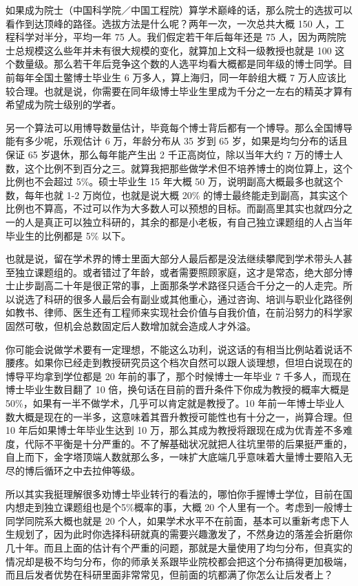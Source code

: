 \documentclass[]{tufte-book}
\begin{document}
如果成为院士（中国科学院／中国工程院）算学术巅峰的话，那么院士的选拔可以看作到达顶峰的路径。选拔方法是什么呢？两年一次，一次总共大概 150 人，工程科学对半分，平均一年 75 人。我们假定若干年后每年还是 75 人，因为两院院士总规模这么些年并未有很大规模的变化，就算加上文科一级教授也就是 100 这个数量级。那么若干年后竞争这个数的人选平均看大概都是同年级的博士同学。目前每年全国土鳖博士毕业生 6 万多人，算上海归，同一年龄组大概 7 万人应该比较合理。也就是说，你需要在同年级博士毕业生里成为千分之一左右的精英才算有希望成为院士级别的学者。

另一个算法可以用博导数量估计，毕竟每个博士背后都有一个博导。那么全国博导能有多少呢，乐观估计 6 万，年龄分布从 35 岁到 65 岁，如果是均匀分布的话且保证 65 岁退休，那么每年能产生出 2 千正高岗位，除以当年大约 7 万的博士人数，这个比例不到百分之三。就算我把那些做学术但不培养博士的岗位算上，这个比例也不会超过 5\%。硕士毕业生 15 年大概 50 万，说明副高大概最多也就这个数，每年也就 1-2 万岗位，也就是说大概 20\% 的博士最终能走到副高，其实这个比例也不算高，不过可以作为大多数人可以预想的目标。而副高里其实也就四分之一的人是真正可以独立科研的，其余的都是小老板，有自己独立课题组的人占当年毕业生的比例都是 5\% 以下。

也就是说，留在学术界的博士里面大部分人最后都是没法继续攀爬到学术带头人甚至独立课题组的。或者错过了年龄，或者需要照顾家庭，这才是常态，绝大部分博士止步副高二十年是很正常的事，上面那条学术路径只适合千分之一的人走完。所以说选了科研的很多人最后会有副业或其他重心，通过咨询、培训与职业化路径例如教书、律师、医生还有工程师来实现社会价值与自我价值，在前沿努力的科学家固然可敬，但机会总数固定后人数增加就会造成人才外溢。

你可能会说做学术要有一定理想，不能这么功利，说这话的有相当比例站着说话不腰疼。如果你已经走到教授研究员这个档次自然可以跟人谈理想，但坦白说现在的博导平均拿到学位都是 20 年前的事了，那个时候博士一年毕业 7 千多人，而现在博士毕业生数目翻了 10 倍，换句话在目前的晋升条件下你成为教授的概率大概是 50\%，如果有一半不做学术，几乎可以肯定就是教授了。10 年前一年博士毕业人数大概是现在的一半多，这意味着其晋升教授可能性也有十分之一，尚算合理。但 10 年后如果博士年毕业生达到 10 万，那么其成为教授将跟现在成为优青差不多难度，代际不平衡是十分严重的。不了解基础状况就把人往坑里带的后果挺严重的，自上而下，金字塔顶端人数就那么多，一味扩大底端几乎意味着大量博士要陷入无尽的博后循环之中去拉伸等级。

所以其实我挺理解很多劝博士毕业转行的看法的，哪怕你手握博士学位，目前在国内想走到独立课题组也是个5\%概率的事，大概 20 个人里有一个。考虑到一般博士同学同院系大概也就是 20 个人，如果学术水平不在前面，基本可以重新考虑下人生规划了，因为此时你选择科研就真的需要兴趣激发了，不然身边的落差会折磨你几十年。而且上面的估计有个严重的问题，那就是大量使用了均匀分布，但真实的情况却是极不均匀分布，你的师承关系跟毕业院校都会把这个分布搞得更加极端，而且后发者优势在科研里面非常常见，但前面的坑都满了你怎么让后发者上？
\end{document}

